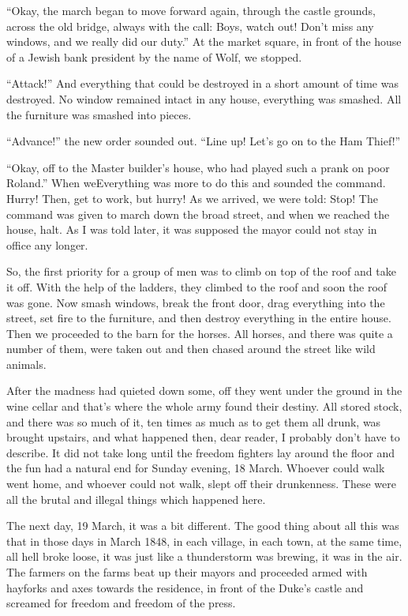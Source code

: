 ``Okay, the march began to move forward again, through the castle grounds, across the old bridge, always with the call: Boys, watch out! Don't miss any windows, and we really did our duty.'' At the market square, in front of the house of a Jewish bank president by the name of Wolf, we stopped.

``Attack!'' And everything that could be destroyed in a short amount of time was destroyed. No window remained intact in any house, everything was smashed. All the furniture was smashed into pieces.

``Advance!'' the new order sounded out. ``Line up! Let's go on to the Ham Thief!''

``Okay, off to the Master builder's house, who had played such a prank on poor Roland.'' When weEverything was more to do this and sounded the command. Hurry! Then, get to work, but hurry! As we arrived, we were told: Stop! The command was given to march down the broad street, and when we reached the house, halt. As I was told later, it was supposed the mayor could not stay in office any longer.

So, the first priority for a group of men was to climb on top of the roof and take it off. With the help of the ladders, they climbed to the roof and soon the roof was gone. Now smash windows, break the front door, drag everything into the street, set fire to the furniture, and then destroy everything in the entire house. Then we proceeded to the barn for the horses. All horses, and there was quite a number of them, were taken out and then chased around the street like wild animals.

After the madness had quieted down some, off they went under the ground in the wine cellar and that's where the whole army found their destiny. All stored stock, and there was so much of it, ten times as much as to get them all drunk, was brought upstairs, and what happened then, dear reader, I probably don't have to describe. It did not take long until the freedom fighters lay around the floor and the fun had a natural end for Sunday evening, 18 March. Whoever could walk went home, and whoever could not walk, slept off their drunkenness. These were all the brutal and illegal things which happened here.

The next day, 19 March, it was a bit different. The good thing about all this was that in those days in March 1848, in each village, in each town, at the same time, all hell broke loose, it was just like a thunderstorm was brewing, it was in the air. The farmers on the farms beat up their mayors and proceeded armed with hayforks and axes towards the residence, in front of the Duke's castle and screamed for freedom and freedom of the press.

